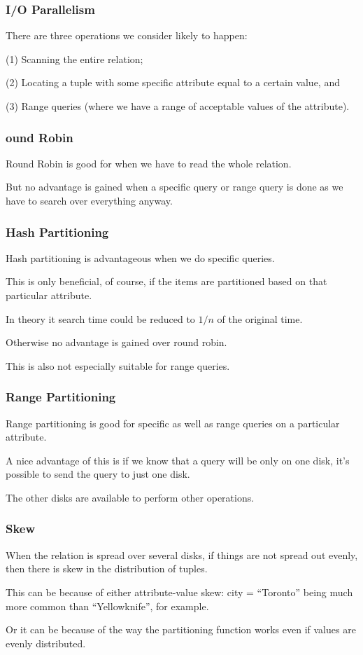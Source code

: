 \begin{frame}
\frametitle{I/O Parallelism}

There are three operations we consider likely to happen:

(1) Scanning the entire relation; 

(2) Locating a tuple with some specific attribute equal to a certain value, and 

(3) Range queries (where we have a range of acceptable values of the attribute).

\end{frame}

\begin{frame}
\frametitle{ound Robin}

Round Robin is good for when we have to read the whole relation. 

But no advantage is gained when a specific query or range query is done as we have to search over everything anyway.

\end{frame}

\begin{frame}
\frametitle{Hash Partitioning}

Hash partitioning is advantageous when we do specific queries. 

This is only beneficial, of course, if the items are partitioned based on that particular attribute. 

In theory it search time could be reduced to $1/n$ of the original time. 

Otherwise no advantage is gained over round robin. 

This is also not especially suitable for range queries.

\end{frame}

\begin{frame}
\frametitle{Range Partitioning}

Range partitioning is good for specific as well as range queries on a particular attribute. 

A nice advantage of this is if we know that a query will be only on one disk, it's possible to send the query to just one disk.

The other disks are available to perform other operations.


\end{frame}

\begin{frame}
\frametitle{Skew}

When the relation is spread over several disks, if things are not spread out evenly, then there is \alert{skew} in the distribution of tuples. 


This can be because of either \alert{attribute-value} skew: city = ``Toronto'' being much more common than ``Yellowknife'', for example.

Or it can be because of the way the partitioning function works even if values are evenly distributed.
\end{frame}


